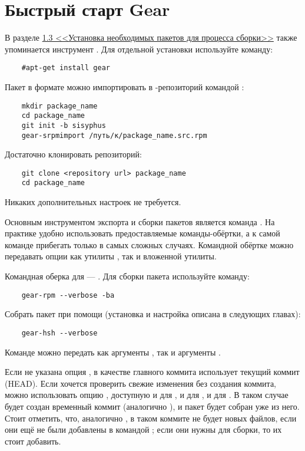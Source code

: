 \section{Быстрый старт Gear}

В разделе \hyperlink{1.3}{1.3 <<Установка необходимых пакетов для процесса сборки>>} 
также упоминается инструмент . Для отдельной установки используйте команду: 
\begin{verbatim}
	#apt-get install gear
\end{verbatim}


Пакет в формате  можно импортировать в -репозиторий командой :
\begin{verbatim}
	mkdir package_name
	cd package_name
	git init -b sisyphus
	gear-srpmimport /путь/к/package_name.src.rpm
\end{verbatim}


Достаточно клонировать репозиторий: 
\begin{verbatim}
	git clone <repository url> package_name
	cd package_name
\end{verbatim}

Никаких дополнительных настроек не требуется.


Основным инструментом экспорта и сборки пакетов является команда . На практике удобно 
использовать предоставляемые команды-обёртки, а к самой команде  прибегать только в 
самых сложных случаях. Командной обёртке можно передавать опции как утилиты , так и 
вложенной утилиты.

Командная оберка  для  --- . Для сборки пакета используйте команду: 
\begin{verbatim}
	gear-rpm --verbose -ba
\end{verbatim}


Собрать пакет при помощи  (установка и настройка  описана в следующих главах): 
\begin{verbatim}
	gear-hsh --verbose
\end{verbatim}

Команде  можно передать как аргументы , так и аргументы .

Если не указана опция ,  в качестве главного коммита использует текущий 
коммит (HEAD). Если хочется проверить свежие изменения без создания коммита, можно использовать опцию 
, доступную и для , и для , и для . В таком случае 
будет создан временный коммит (аналогично ), и пакет будет собран уже из него. 
Стоит отметить, что, аналогично , в таком коммите не будет новых файлов, если они 
ещё не были добавлены в  командой ; если они нужны для сборки, то их стоит добавить. 

